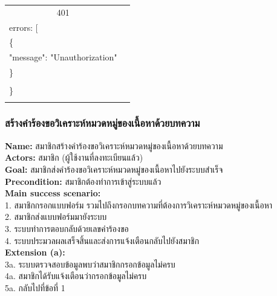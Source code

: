 \documentclass[12pt,oneside,openright,a4paper]{cpe-thai-project}
\begin{document}
\begin{itemize}
\begin{longtable}[!ht]{p{3cm}|p{8cm}}
    \multicolumn{1}{c|}{401}  &
    \begin{tabular}[c]{@{}l@{}}\{\\ \quad errors: {[}\\ \quad\quad\{\\ \quad\quad\quad"message": "Unauthorization"\\ \quad\quad\}\\\quad {]}\\ \}\end{tabular}                                                                         \\ \hline
    \hhline{==}
\end{longtable}

\subsubsection{สร้างคำร้องขอวิเคราะห์หมวดหมู่ของเนื้อหาด้วยบทความ}
\textbf{Name: }สมาชิกสร้างคำร้องขอวิเคราะห์หมวดหมู่ของเนื้อหาด้วยบทความ \\
\textbf{Actors: }สมาชิก (ผู้ใช้งานที่ลงทะเบียนแล้ว) \\
\textbf{Goal: }สมาชิกส่งคำร้องขอวิเคราะห์หมวดหมู่ของเนื้อหาไปยังระบบสำเร็จ \\
\textbf{Precondition: }สมาชิกต้องทำการเข้าสู่ระบบแล้ว \\
\textbf{Main success scenario: } \\
  \hspace*{0.5cm}1. สมาชิกกรอกแบบฟอร์ม รวมไปถึงกรอกบทความที่ต้องการวิเคราะห์หมวดหมู่ของเนื้อหา \\
  \hspace*{0.5cm}2. สมาชิกส่งแบบฟอร์มมายังระบบ \\
  \hspace*{0.5cm}3. ระบบทำการตอบกลับด้วยเลขคำร้องขอ \\
  \hspace*{0.5cm}4. ระบบประมวลผลเสร็จสิ้นและส่งการแจ้งเตือนกลับไปยังสมาชิก \\
\textbf{Extension (a): } \\
  \hspace*{0.5cm}3a. ระบบตรวจสอบข้อมูลพบว่าสมาชิกกรอกข้อมูลไม่ครบ \\
  \hspace*{0.5cm}4a. สมาชิกได้รับแจ้งเตือนว่ากรอกข้อมูลไม่ครบ \\
  \hspace*{0.5cm}5a. กลับไปที่ข้อที่ 1 \newpage
\begin{figure}[!ht]\centering

\end{figure}
\end{itemize}
\end{document}
